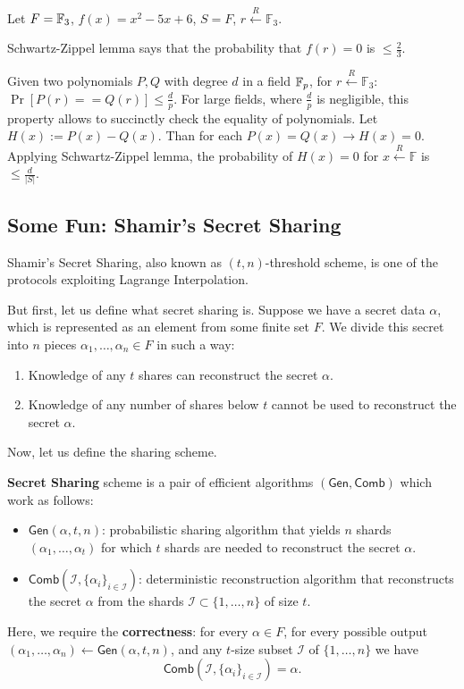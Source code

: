 \documentclass[../lecture-notes-148x210.tex]{subfiles}
\begin{document}
\begin{example}
Let $F = \mathbb{F}_3$, $f(x) = x^2 - 5x + 6$, $S = F$, $r \xleftarrow{R} \mathbb{F}_3$.

Schwartz-Zippel lemma says that the probability that $f(r) = 0$ is $\le \frac{2}{3}$.
\end{example}

Given two polynomials $P, Q$ with  degree $d$ in a field $\mathbb{F}_p$, for $r \xleftarrow{R} \mathbb{F}_3$: $\Pr[P(r) == Q(r)] \le \frac{d}{p}$.
For large fields, where  $\frac{d}{p}$ is negligible, this property allows to succinctly check the equality of polynomials.
Let $H(x) := P(x) - Q(x)$. Than for each $P(x) = Q(x) \rightarrow H(x) = 0$. Applying Schwartz-Zippel lemma, 
the probability of $H(x) = 0$ for $x \xleftarrow{R} \mathbb{F} $ is $\le \frac{d}{|S|}$.

\subsection{Some Fun: Shamir's Secret Sharing}

Shamir's Secret Sharing, also known as $(t,n)$-threshold scheme, is one of the protocols exploiting Lagrange Interpolation. 

But first, let us define what secret sharing is. Suppose we have a secret data $\alpha$, which is represented as an element from some finite set $F$. We divide this secret into $n$ pieces $\alpha_1,\dots,\alpha_n \in F$ in such a way:
\begin{enumerate}
    \item Knowledge of any $t$ shares can reconstruct the secret $\alpha$.
    \item Knowledge of any number of shares below $t$ cannot be used to reconstruct the secret $\alpha$.
\end{enumerate}

Now, let us define the sharing scheme.

\begin{definition}
    \textbf{Secret Sharing} scheme is a pair of efficient algorithms $(\mathsf{Gen}, \mathsf{Comb})$ which work as follows:
    \begin{itemize}
        \item $\mathsf{Gen}(\alpha, t, n)$: probabilistic sharing algorithm that yields $n$ shards $(\alpha_1,\dots,\alpha_t)$ for which $t$ shards are needed to reconstruct the secret $\alpha$.
        \item $\mathsf{Comb}(\mathcal{I}, \{\alpha_i\}_{i \in \mathcal{I}})$: deterministic reconstruction algorithm that reconstructs the secret $\alpha$ from the shards $\mathcal{I} \subset \{1,\dots,n\}$ of size $t$.
    \end{itemize}

    Here, we require the \textbf{correctness}: for every $\alpha \in F$, for every possible output $(\alpha_1,\dots,\alpha_n) \gets \mathsf{Gen}(\alpha, t, n)$, and any $t$-size subset $\mathcal{I}$ of $\{1,\dots,n\}$ we have
    \begin{equation*}
        \mathsf{Comb}(\mathcal{I}, \{\alpha_i\}_{i \in \mathcal{I}}) = \alpha.
    \end{equation*}
\end{definition}
\end{document}
